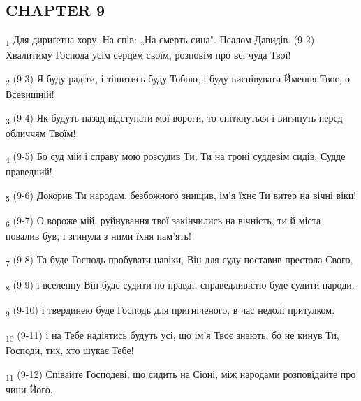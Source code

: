 \subsection{CHAPTER 9}
\begin{tcolorbox}
\textsubscript{1} Для дириґетна хору. На спів: „На смерть сина". Псалом Давидів. (9-2) Хвалитиму Господа усім серцем своїм, розповім про всі чуда Твої!
\end{tcolorbox}
\begin{tcolorbox}
\textsubscript{2} (9-3) Я буду радіти, і тішитись буду Тобою, і буду виспівувати Ймення Твоє, о Всевишній!
\end{tcolorbox}
\begin{tcolorbox}
\textsubscript{3} (9-4) Як будуть назад відступати мої вороги, то спіткнуться і вигинуть перед обличчям Твоїм!
\end{tcolorbox}
\begin{tcolorbox}
\textsubscript{4} (9-5) Бо суд мій і справу мою розсудив Ти, Ти на троні суддевім сидів, Судде праведний!
\end{tcolorbox}
\begin{tcolorbox}
\textsubscript{5} (9-6) Докорив Ти народам, безбожного знищив, ім'я їхнє Ти витер на вічні віки!
\end{tcolorbox}
\begin{tcolorbox}
\textsubscript{6} (9-7) О вороже мій, руйнування твої закінчились на вічність, ти й міста повалив був, і згинула з ними їхня пам'ять!
\end{tcolorbox}
\begin{tcolorbox}
\textsubscript{7} (9-8) Та буде Господь пробувати навіки, Він для суду поставив престола Свого,
\end{tcolorbox}
\begin{tcolorbox}
\textsubscript{8} (9-9) і вселенну Він буде судити по правді, справедливістю буде судити народи.
\end{tcolorbox}
\begin{tcolorbox}
\textsubscript{9} (9-10) і твердинею буде Господь для пригніченого, в час недолі притулком.
\end{tcolorbox}
\begin{tcolorbox}
\textsubscript{10} (9-11) і на Тебе надіятись будуть усі, що ім'я Твоє знають, бо не кинув Ти, Господи, тих, хто шукає Тебе!
\end{tcolorbox}
\begin{tcolorbox}
\textsubscript{11} (9-12) Співайте Господеві, що сидить на Сіоні, між народами розповідайте про чини Його,
\end{tcolorbox}
